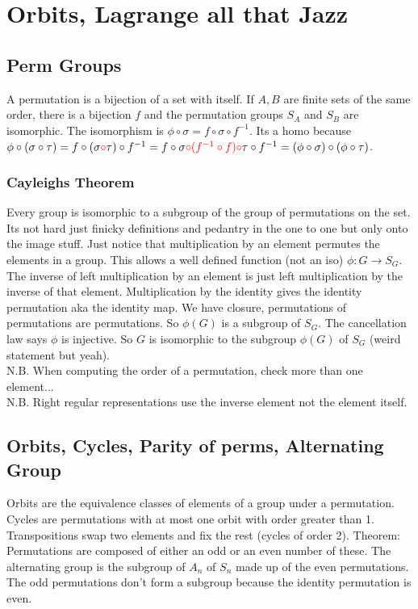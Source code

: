 \section{Orbits, Lagrange all that Jazz}
\subsection{Perm Groups}
A permutation is a bijection of a set with itself.
If $A,B$ are finite sets of the same order, there is a bijection $f$ and the permutation groups $S_A$ and $S_B$ are isomorphic. The isomorphism is $
\phi \circ \sigma = f \circ \sigma \circ f^{-1}$. Its a homo because
$\phi \circ (\sigma \circ \tau) = f \circ (\sigma \textcolor{red}{\circ} \tau) \circ f^{-1} = f \circ \sigma \textcolor{red}{\circ (f^{-1} \circ f) \circ} \tau \circ f^{-1} = (\phi \circ \sigma) \circ (\phi \circ \tau)$.
\subsubsection{Cayleighs Theorem}
Every group is isomorphic to a subgroup of the group of permutations on the set.
Its not hard just finicky definitions and pedantry in the one to one but only onto the image stuff. Just notice that multiplication by an element permutes the elements in a group.
This allows a well defined function (not an iso) $\phi: G \to S_G$.
The inverse of left multiplication by an element is just left multiplication by the inverse of that element. Multiplication by the identity gives the identity permutation aka the identity map. We have closure, permutations of permutations are permutations. So $\phi(G)$ is a subgroup of $S_G$. The cancellation law says $\phi$ is injective. So $G$ is isomorphic to the subgroup $\phi(G)$ of $S_G$ (weird statement but yeah). \\ \newline
N.B. When computing the order of a permutation, check more than one element... \\ \newline
N.B. Right regular representations use the inverse element not the element itself.
\subsection{Orbits, Cycles, Parity of perms, Alternating Group}
Orbits are the equivalence classes of elements of a group under a permutation. Cycles are permutations with at most one orbit with order greater than 1.
Transpositions swap two elements and fix the rest (cycles of order 2). Theorem: Permutations are composed of either an odd or an even number of these.
The alternating group is the subgroup of $A_n$ of $S_n$ made up of the even permutations. The odd permutations don't form a subgroup because the identity permutation is even.

